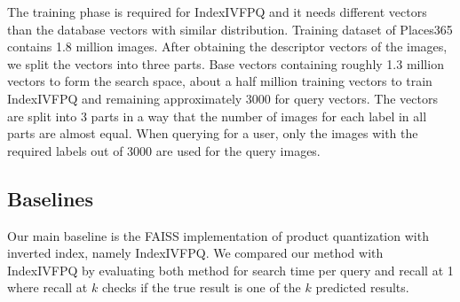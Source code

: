 The training phase is required for IndexIVFPQ and it needs different vectors than the database vectors with similar distribution.
Training dataset of Places365 contains 1.8 million images. 
After obtaining the descriptor vectors of the images, we split the vectors into three parts.
Base vectors containing roughly 1.3 million vectors to form the search space, about a half million training vectors to train IndexIVFPQ and remaining approximately 3000 for query vectors.
The vectors are split into 3 parts in a way that the number of images for each label in all parts are almost equal.
When querying for a user, only the images with the required labels out of 3000 are used for the query images.

\subsection{Baselines}

Our main baseline is the FAISS implementation\cite{faiss} of product quantization with inverted index, namely IndexIVFPQ.
We compared our method with IndexIVFPQ by evaluating both method for search time per query and recall at 1 where recall at $k$ checks if the true result is one of the $k$ predicted results. 


